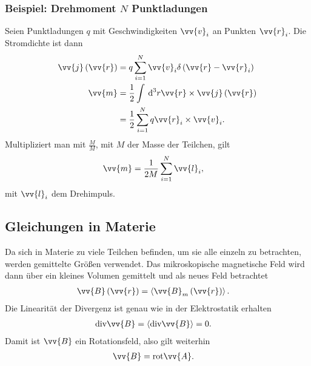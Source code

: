 \documentclass[a4paper,12pt]{article}
\newcommand{\td}{\,\text{d}}
\numberwithin{equation}{section}
\begin{document}
\subsubsection{Beispiel: Drehmoment $N$ Punktladungen}
Seien Punktladungen $q$ mit Geschwindigkeiten $\vv{v}_i$ an Punkten $\vv{r}_i$.
Die Stromdichte ist dann
\begin{align} 
        \vv{j}\left(\vv{r}\right)&=q\sum_{i=1}^{N}\vv{v}_i\delta \left(\vv{r}-\vv{r}_i\right)\\
        \vv{m}&=\dfrac{1}{2}\int_{}^{}\td ^3r\vv{r}\times \vv{j}\left(\vv{r}\right)\\
              &=\dfrac{1}{2}\sum_{i=1}^{N}q\vv{r}_i\times \vv{v}_i
.\end{align} 
Multipliziert man mit $\tfrac{M}{M}$, mit $M$ der Masse der Teilchen, gilt
\begin{align} 
        \vv{m}&=\dfrac{1}{2M}\sum_{i=1}^{N}\vv{l}_i
,\end{align} 
mit $\vv{l}_i$ dem Drehimpuls.

\subsection{Gleichungen in Materie}
Da sich in Materie zu viele Teilchen befinden, um sie alle einzeln zu betrachten, werden gemittelte Größen verwendet.
Das mikroskopische magnetische Feld wird dann über ein kleines Volumen gemittelt und als neues Feld betrachtet
\begin{align} 
        \vv{B}\left(\vv{r}\right)&=\left\langle \vv{B}_m\left(\vv{r}\right)\right\rangle 
.\end{align} 
Die Linearität der Divergenz ist genau wie in der Elektrostatik erhalten
\begin{align} 
        \text{div}\vv{B}&=\left\langle \text{div}\vv{B}\right\rangle =0
.\end{align} 
Damit ist $\vv{B}$ ein Rotationsfeld, also gilt weiterhin
\begin{align} 
        \vv{B}&=\text{rot}\vv{A}
.\end{align} 
\end{document}
